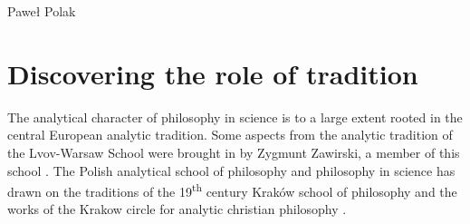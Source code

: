 \begin{artengenv}{Paweł Polak}
\section{Discovering the role of tradition}
The analytical character of philosophy in science is to a large extent rooted in the central European analytic
tradition. Some aspects from the analytic tradition of the Lvov-Warsaw School were brought in by Zygmunt Zawirski, a
member of this school
\parencite{pol_jadacki_polish_2009}.
The Polish analytical school of philosophy and philosophy in science has
drawn on the traditions of the 19\textsuperscript{th} century Kraków school of philosophy
\parencite{pol_polak_19th_2011}
and the works
of the Krakow circle for analytic christian philosophy
\parencite{pol_wolak_naukowa_2005-1}.


\end{artengenv}
